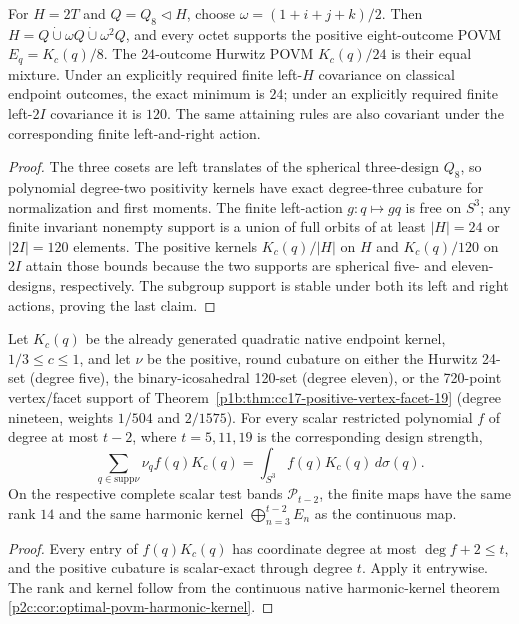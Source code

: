 \documentclass[12pt,a4paper]{article}
\begin{document}
\begin{corollary}
\label{p2c:cor:v368-octet-and-finite-symmetry}
For $H=2T$ and $Q=Q_8\triangleleft H$, choose
$\omega=(1+i+j+k)/2$. Then
$H=Q\dot\cup\omega Q\dot\cup\omega^2Q$, and every octet
supports the positive eight-outcome POVM $E_q=K_c(q)/8$.
The $24$-outcome Hurwitz POVM $K_c(q)/24$ is their equal mixture.
Under an explicitly required finite left-$H$ covariance on classical
endpoint outcomes, the exact minimum is $24$; under an explicitly
required finite left-$2I$ covariance it is $120$.
The same attaining rules are also covariant under the corresponding
finite left-and-right action.
\end{corollary}
\begin{proof}
The three cosets are left translates of the spherical
three-design $Q_8$, so polynomial degree-two positivity kernels
have exact degree-three cubature for normalization and first moments.
The finite left-action $g:q\mapsto gq$ is free on $S^3$;
any finite invariant nonempty support is a union of full orbits
of at least $|H|=24$ or $|2I|=120$ elements. The positive kernels
$K_c(q)/|H|$ on $H$ and $K_c(q)/120$ on $2I$ attain those
bounds because the two supports are spherical five- and eleven-designs,
respectively. The subgroup support is stable under both its left and
right actions, proving the last claim.
\end{proof}

\begin{corollary}
\label{p2c:cor:v368-finite-moment-ports}
Let $K_c(q)$ be the already generated quadratic native endpoint kernel,
$1/3\le c\le1$, and let $\nu$ be the positive, round cubature
on either the Hurwitz 24-set (degree five), the binary-icosahedral
120-set (degree eleven), or the 720-point vertex/facet support
of Theorem~\ref{p1b:thm:cc17-positive-vertex-facet-19}
(degree nineteen, weights $1/504$ and $2/1575$).
For every scalar restricted polynomial $f$ of degree at most
$t-2$, where $t=5,11,19$ is the corresponding design strength,
\[
\sum_{q\in\mathrm{supp}\nu}\nu_q f(q)K_c(q)
=\int_{S^3}f(q)K_c(q)\,d\sigma(q).
\]
On the respective complete scalar test bands $\mathcal P_{t-2}$,
the finite maps have the same rank $14$ and the same harmonic kernel
$\bigoplus_{n=3}^{t-2}E_n$ as the continuous map.
\end{corollary}
\begin{proof}
Every entry of $f(q)K_c(q)$ has coordinate degree at most
$\deg f+2\le t$, and the positive cubature is scalar-exact through
degree $t$. Apply it entrywise. The rank and kernel follow from
the continuous native harmonic-kernel theorem
\ref{p2c:cor:optimal-povm-harmonic-kernel}.
\end{proof}
\end{document}
